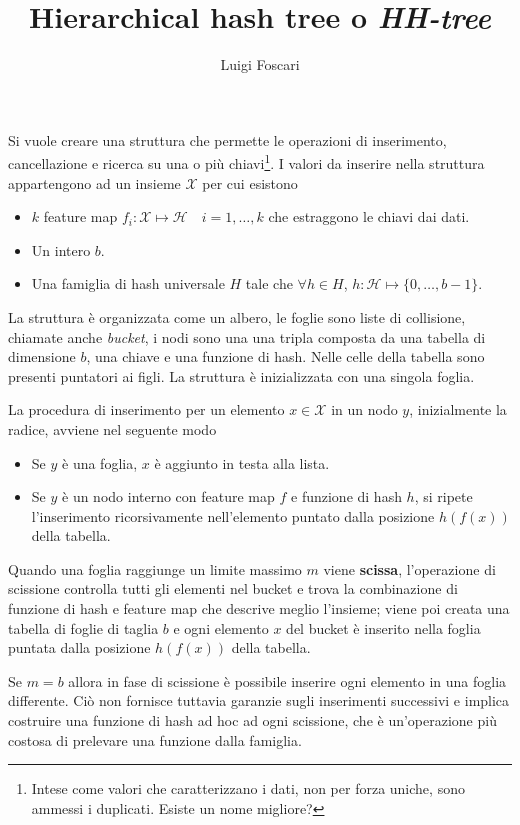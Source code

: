\documentclass[a4paper]{article}
\title{Hierarchical hash tree o \textit{HH-tree}}
\author{Luigi Foscari}
\date{}
\begin{document}
\maketitle

Si vuole creare una struttura che permette le operazioni di inserimento, cancellazione e ricerca su una o più chiavi\footnote{Intese come valori che caratterizzano i dati, non per forza uniche, sono ammessi i duplicati. Esiste un nome migliore?}. I valori da inserire nella struttura appartengono ad un insieme $\mathcal{X}$ per cui esistono
\begin{itemize}
	\item $k$ feature map $f_i: \mathcal{X} \mapsto \mathcal{H} \quad i=1,\ldots,k$ che estraggono le chiavi dai dati.
	\item Un intero $b$.
	\item Una famiglia di hash universale $H$ tale che $\forall h \in H$, $h: \mathcal{H} \mapsto \{ 0, \ldots, b - 1 \}$.
\end{itemize}

La struttura è organizzata come un albero, le foglie sono liste di collisione, chiamate anche \textit{bucket}, i nodi sono una una tripla composta da una tabella di dimensione $b$, una chiave e una funzione di hash. Nelle celle della tabella sono presenti puntatori ai figli. La struttura è inizializzata con una singola foglia.

La procedura di inserimento per un elemento $x \in \mathcal{X}$ in un nodo $y$, inizialmente la radice, avviene nel seguente modo
\begin{itemize}
	\item Se $y$ è una foglia, $x$ è aggiunto in testa alla lista.
	\item Se $y$ è un nodo interno con feature map $f$ e funzione di hash $h$, si ripete l'inserimento ricorsivamente nell'elemento puntato dalla posizione $h(f(x))$ della tabella.
\end{itemize}

Quando una foglia raggiunge un limite massimo $m$ viene \textbf{scissa}, l'operazione di scissione controlla tutti gli elementi nel bucket e trova la combinazione di funzione di hash e feature map che descrive meglio l'insieme; viene poi creata una tabella di foglie di taglia $b$ e ogni elemento $x$ del bucket è inserito nella foglia puntata dalla posizione $h(f(x))$ della tabella.

Se $m = b$ allora in fase di scissione è possibile inserire ogni elemento in una foglia differente. Ciò non fornisce tuttavia garanzie sugli inserimenti successivi e implica costruire una funzione di hash ad hoc ad ogni scissione, che è un'operazione più costosa di prelevare una funzione dalla famiglia.
\end{document}
